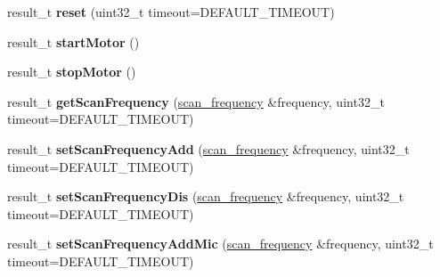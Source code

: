 \begin{DoxyCompactItemize}
\item 
result\+\_\+t {\bfseries reset} (uint32\+\_\+t timeout=D\+E\+F\+A\+U\+L\+T\+\_\+\+T\+I\+M\+E\+O\+UT)\hypertarget{classydlidar_1_1_y_dlidar_driver_a3dd4086c5685163f7c7487ea0f5af08c}{}\label{classydlidar_1_1_y_dlidar_driver_a3dd4086c5685163f7c7487ea0f5af08c}

\item 
result\+\_\+t {\bfseries start\+Motor} ()\hypertarget{classydlidar_1_1_y_dlidar_driver_a2e686ef1ce60f3241352a798330f760b}{}\label{classydlidar_1_1_y_dlidar_driver_a2e686ef1ce60f3241352a798330f760b}

\item 
result\+\_\+t {\bfseries stop\+Motor} ()\hypertarget{classydlidar_1_1_y_dlidar_driver_a6cdf0c5a7ddf2375c1392c3a0e65edfe}{}\label{classydlidar_1_1_y_dlidar_driver_a6cdf0c5a7ddf2375c1392c3a0e65edfe}

\item 
result\+\_\+t {\bfseries get\+Scan\+Frequency} (\hyperlink{structscan__frequency}{scan\+\_\+frequency} \&frequency, uint32\+\_\+t timeout=D\+E\+F\+A\+U\+L\+T\+\_\+\+T\+I\+M\+E\+O\+UT)\hypertarget{classydlidar_1_1_y_dlidar_driver_a76efb701e137121b213f61028e3f235e}{}\label{classydlidar_1_1_y_dlidar_driver_a76efb701e137121b213f61028e3f235e}

\item 
result\+\_\+t {\bfseries set\+Scan\+Frequency\+Add} (\hyperlink{structscan__frequency}{scan\+\_\+frequency} \&frequency, uint32\+\_\+t timeout=D\+E\+F\+A\+U\+L\+T\+\_\+\+T\+I\+M\+E\+O\+UT)\hypertarget{classydlidar_1_1_y_dlidar_driver_a0feea99573991bb4eb6f8e1718a71435}{}\label{classydlidar_1_1_y_dlidar_driver_a0feea99573991bb4eb6f8e1718a71435}

\item 
result\+\_\+t {\bfseries set\+Scan\+Frequency\+Dis} (\hyperlink{structscan__frequency}{scan\+\_\+frequency} \&frequency, uint32\+\_\+t timeout=D\+E\+F\+A\+U\+L\+T\+\_\+\+T\+I\+M\+E\+O\+UT)\hypertarget{classydlidar_1_1_y_dlidar_driver_a811e3e1f0012925c8a90aebda9716738}{}\label{classydlidar_1_1_y_dlidar_driver_a811e3e1f0012925c8a90aebda9716738}

\item 
result\+\_\+t {\bfseries set\+Scan\+Frequency\+Add\+Mic} (\hyperlink{structscan__frequency}{scan\+\_\+frequency} \&frequency, uint32\+\_\+t timeout=D\+E\+F\+A\+U\+L\+T\+\_\+\+T\+I\+M\+E\+O\+UT)\hypertarget{classydlidar_1_1_y_dlidar_driver_aa801f64f5ca2ce1e70ee096eb0b4b612}{}\label{classydlidar_1_1_y_dlidar_driver_aa801f64f5ca2ce1e70ee096eb0b4b612}


\end{DoxyCompactItemize}
